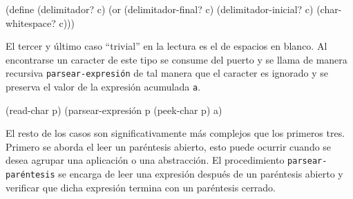 \documentclass[letterpaper,twoside,openright,11pt]{book}
\begin{document}
\nwenddocs{}\plusendmoddef
(define (delimitador? c)
  (or (delimitador-final? c)
      (delimitador-inicial? c)
      (char-whitespace? c)))

\eatline
{}\nwendcode{}\nwdocspar

El tercer y último caso ``trivial'' en la lectura es el de espacios en blanco. Al encontrarse un caracter de este tipo se consume del puerto y se llama de manera recursiva {\tt{}\protect{}parsear-expresión} de tal manera que el caracter es ignorado y se preserva el valor de la expresión acumulada {\tt{}a}.

\nwenddocs{}\endmoddef
(read-char p)
(parsear-expresión p (peek-char p) a)
\nwendcode{}\nwdocspar

El resto de los casos son significativamente más complejos que los primeros tres. Primero se aborda el leer un paréntesis abierto, esto puede ocurrir cuando se desea agrupar una aplicación o una abstracción. El procedimiento {\tt{}\protect{}parsear-paréntesis} se encarga de leer una expresión después de un paréntesis abierto y verificar que dicha expresión termina con un paréntesis cerrado.
\end{document}
